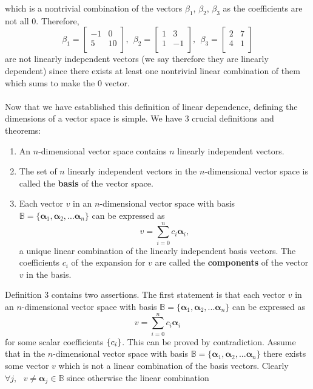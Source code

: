 which is a nontrivial combination of the vectors $\beta_{1}$, $\beta_{2}$, $\beta_{3}$ as the coefficients are not all $0$. Therefore,
$$
\beta_{1} = \begin{bmatrix}
    -1 & 0 \\
    5 & 10 \\
    \end{bmatrix}, \:\:
\beta_{2} = \begin{bmatrix}
    1 & 3 \\
    1 & -1 \\
    \end{bmatrix}, \:\:
\beta_{3} = \begin{bmatrix}
    2 & 7 \\
    4 & 1 \\
    \end{bmatrix}
$$
are not linearly independent vectors (we say therefore they are linearly dependent) since there exists at least one nontrivial linear combination of them which sums to make the $0$ vector.
\\\\
Now that we have established this definition of linear dependence, defining the dimensions of a vector space is simple. We have 3 crucial definitions and theorems:
\begin{enumerate}
    \item An $n$-dimensional vector space contains $n$ linearly independent vectors.
    \item The set of $n$ linearly independent vectors in the $n$-dimensional vector space is called the \textbf{basis} of the vector space.
    \item Each vector $v$ in an $n$-dimensional vector space with basis \\ $\mathbb{B}= \{\bm{\alpha}_1, \bm{\alpha}_2, ...\bm{\alpha}_n\}$ can be expressed as 
    $$
    v=\sum_{i=0}^{n}c_{i}\bm{\alpha}_{i},
    $$
    a unique linear combination of the linearly independent basis vectors. The coefficients $c_{i}$ of the expansion for $v$ are called the \textbf{components} of the vector $v$ in the basis.
\end{enumerate}
Definition $3$ contains two assertions. The first statement is that each vector $v$ in an $n$-dimensional vector space with basis $\mathbb{B}= \{\bm{\alpha}_1, \bm{\alpha}_2, ...\bm{\alpha}_n\}$ can be expressed as 
$$
v=\sum_{i=0}^{n}c_{i}\bm{\alpha}_{i}
$$ for some scalar coefficients $\{c_{i}\}$. This can be proved by contradiction. Assume that in the $n$-dimensional vector space with basis $\mathbb{B}= \{\bm{\alpha}_1, \bm{\alpha}_2, ...\bm{\alpha}_n\}$ there exists some vector $v$ which is not a linear combination of the basis vectors. Clearly $\forall j, \:\:\: v \neq \bm{\alpha}_{j} \in \mathbb{B}$ since otherwise the linear combination 
